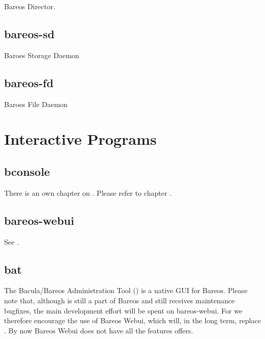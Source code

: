 Bareos Director.

\subsection{bareos-sd}
\label{command-bareos-sd}

Baroes Storage Daemon


\subsection{bareos-fd}
\label{command-bareos-fd}

Baroes File Daemon


\section{Interactive Programs}

\subsection{bconsole}

There is an own chapter on .
Please refer to chapter .

\subsection{bareos-webui}

See .

\subsection{bat}
\label{bat}

The Bacula/Bareos Administration Tool () is a native GUI for Bareos. Please note that, although  is still a part of Bareos and still receives maintenance bugfixes, the main development effort will be spent on bareos-webui. For  we therefore encourage the use of Bareos Webui, which will, in the long term, replace . By now Bareos Webui does not have all the features  offers.

